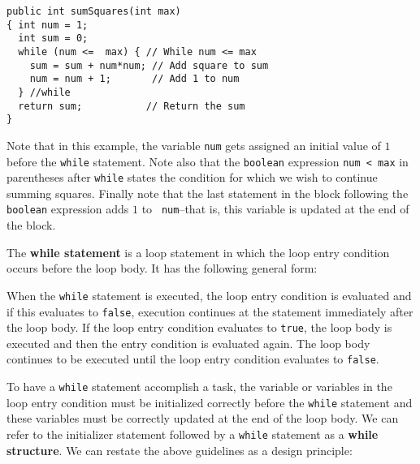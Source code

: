 \begin{jjjlisting}
\begin{lstlisting}
public int sumSquares(int max)
{ int num = 1;
  int sum = 0;
  while (num <=  max) { // While num <= max
    sum = sum + num*num; // Add square to sum
    num = num + 1;       // Add 1 to num
  } //while
  return sum;           // Return the sum
}
\end{lstlisting}
\end{jjjlisting}

\noindent Note that in this example, the variable {\tt num} gets
assigned an initial value of $1$ before the {\tt while} statement.
Note also that the {\tt boolean} expression {\tt num < max} in
parentheses after {\tt while} states the condition for which we wish
to continue summing squares.  Finally note that the last statement in
the block following the {\tt boolean} expression adds $1$ to {\tt
num}--that is, this variable is updated at the end of the block.

The {\bf while statement} is a loop statement
in which the loop entry condition occurs before the loop body. It has
the following general form:


\noindent When the {\tt while} statement is executed, the loop entry condition
is evaluated and if this evaluates to {\tt false}, execution continues
at the statement immediately after the loop body.  If the loop entry condition
evaluates to {\tt true}, the loop body is executed  and then the
entry condition
is evaluated again.  The loop body continues to be executed until the
loop entry
condition evaluates to {\tt false}.


To have a {\tt while} statement accomplish a task, the variable or
variables in the loop entry condition must be initialized correctly before the
{\tt while} statement and these variables must be correctly updated at the
end of the loop body.  We can refer to the initializer statement
followed by a {\tt while} statement as a {\bf while structure}.
We can restate the above guidelines as a design principle:



